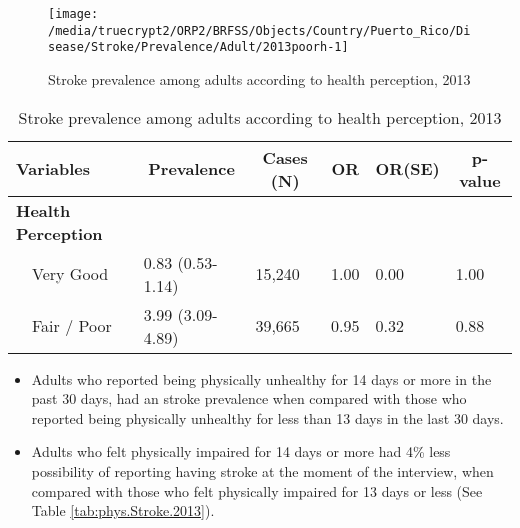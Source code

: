 \begin{figure}[H]
\caption{Stroke prevalence among adults according to health perception,
         2013}
\label{fig:fairpoor.Stroke.2013}

\begin{knitrout}
\color{fgcolor}

{\centering \texttt{[image: /media/truecrypt2/ORP2/BRFSS/Objects/Country/Puerto\_Rico/Disease/Stroke/Prevalence/Adult/2013poorh-1]} 

}



\end{knitrout}
 \end{figure}

\begin{table}[H]
\caption{Stroke prevalence  among adults according to health perception, 2013\label{tab:fairpoor.Stroke.2013}} 
\begin{center}
\begin{tabular}{llllll}
\hline\hline
\multicolumn{1}{l}{Variables}&\multicolumn{1}{c}{Prevalence}&\multicolumn{1}{c}{Cases (N)}&\multicolumn{1}{c}{OR}&\multicolumn{1}{c}{OR(SE)}&\multicolumn{1}{c}{p-value}\tabularnewline
\hline
{\bfseries Health Perception}&&&&&\tabularnewline
~~Very Good&0.83 (0.53-1.14)&15,240&1.00&0.00&1.00\tabularnewline
~~Fair / Poor&3.99 (3.09-4.89)&39,665&0.95&0.32&0.88\tabularnewline
\hline
\end{tabular}\end{center}

\end{table}

 
\newpage

 \newpage
\begin{itemize}

\item Adults who reported being physically unhealthy for 14 days or more in the past 30 days, had an  
 stroke prevalence when compared with 
those who reported being physically unhealthy for less than 13 days in the last 30 days.


\item Adults who felt physically impaired for 14 days or more had 4\% less possibility of reporting having stroke at the moment of the interview, when compared with those who felt physically impaired for 13 days or less (See Table \ref{tab:phys.Stroke.2013}).

\end{itemize}

